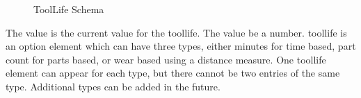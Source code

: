 \begin{figure}[ht]
  \centering
  \caption{ToolLife Schema}
  \label{fig:toollife-schema}
\end{figure}

\FloatBarrier

The value is the current value for the \gls{toollife}.  The value \MUST be a number.  \gls{toollife} is an option element which can have three types, either minutes for time based, part count for parts based, or wear based using a distance measure.  One \gls{toollife} element can appear for each type, but there cannot be two entries of the same type.  Additional types can be added in the future.

